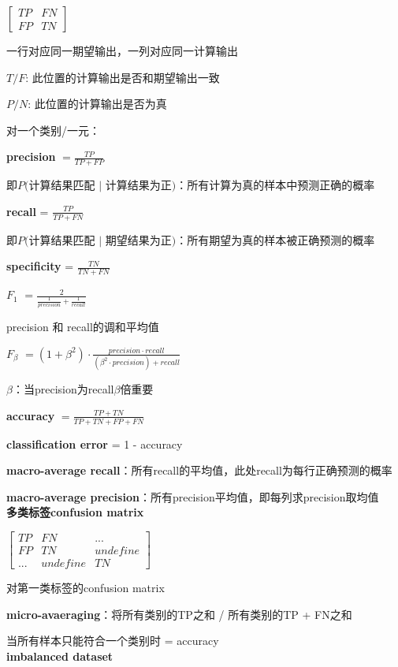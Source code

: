 \documentclass[UTF8]{ctexart}
\begin{document}
  $\begin{bmatrix}
    TP & FN \\
    FP & TN
  \end{bmatrix}$

  一行对应同一期望输出，一列对应同一计算输出

  $T/F$: 此位置的计算输出是否和期望输出一致

  $P/N$: 此位置的计算输出是否为真

  对一个类别/一元：

  \quad \textbf{precision} $= \frac{TP}{TP + FP}$

  \quad \quad 即$P($计算结果匹配 $|$ 计算结果为正$)$：所有计算为真的样本中预测正确的概率

  \quad \textbf{recall} = $\frac{TP}{TP + FN}$

  \quad \quad 即$P($计算结果匹配 $|$ 期望结果为正$)$：所有期望为真的样本被正确预测的概率

  \quad \textbf{specificity} = $\frac{TN}{TN + FN}$

  \quad \textbf{$F_1$} $= \frac{2}{\frac{1}{precision} + \frac{1}{recall}}$ 
  
  \quad \quad precision 和 recall的调和平均值

  \quad \textbf{$F_\beta$} $= (1 + \beta^2) \cdot \frac{precision \cdot recall}{(\beta^2 \cdot precision) + recall}$

  \quad \quad $\beta$：当precision为recall$\beta$倍重要

  \textbf{accuracy} $= \frac{TP + TN}{TP + TN + FP + FN}$

  \textbf{classification error} = 1 - accuracy
  
  \textbf{macro-average recall}：所有recall的平均值，此处recall为每行正确预测的概率

  \textbf{macro-average precision}：所有precision平均值，即每列求precision取均值\\
\textbf{多类标签confusion matrix}

  $\begin{bmatrix}
    TP & FN & ... \\
    FP & TN & undefine\\
    ... & undefine & TN
  \end{bmatrix}$
  
  对第一类标签的confusion matrix
  
  \textbf{micro-avaeraging}：将所有类别的TP之和 / 所有类别的TP + FN之和
  
  \quad 当所有样本只能符合一个类别时 = accuracy\\
\textbf{imbalanced dataset}
\end{document}
